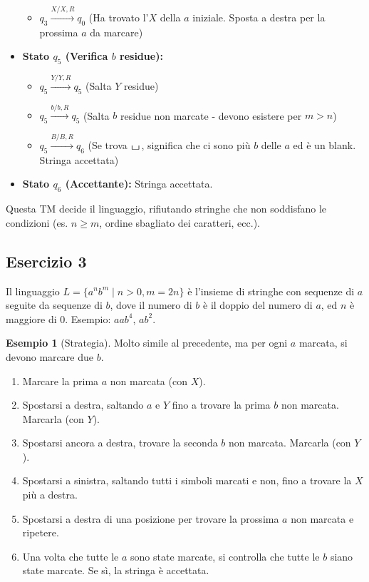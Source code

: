 \documentclass[a4paper]{article}
\theoremstyle{definition} %
\newtheorem{example}{Esempio}
\newcommand{\blankS}{\ensuremath{\raisebox{-0.15ex}{\scalebox{1.3}[0.7]{$\sqcup$}}\mkern2mu}}
\begin{document}
\begin{itemize}
\begin{itemize}
            \item $q_3 \xrightarrow{X / X, R} q_0$ (Ha trovato l'$X$ della $a$ iniziale. Sposta a destra per la prossima $a$ da marcare)
        \end{itemize}
    \item \textbf{Stato $q_5$ (Verifica $b$ residue):}
        \begin{itemize}
            \item $q_5 \xrightarrow{Y / Y, R} q_5$ (Salta $Y$ residue)
            \item $q_5 \xrightarrow{b / b, R} q_5$ (Salta $b$ residue non marcate - devono esistere per $m>n$)
            \item $q_5 \xrightarrow{B / B, R} q_6$ (Se trova \blankS, significa che ci sono più $b$ delle $a$ ed è un blank. Stringa accettata)
        \end{itemize}
    \item \textbf{Stato $q_6$ (Accettante):} Stringa accettata.
\end{itemize}
Questa TM decide il linguaggio, rifiutando stringhe che non soddisfano le condizioni (es. $n \ge m$, ordine sbagliato dei caratteri, ecc.).

\subsection{Esercizio 3}
Il linguaggio $L = \{a^n b^m \mid n > 0, m = 2n\}$ è l'insieme di stringhe con sequenze di $a$ seguite da sequenze di $b$, dove il numero di $b$ è il doppio del numero di $a$, ed $n$ è maggiore di $0$. Esempio: $aab^{4}$, $ab^{2}$.

\begin{example}[Strategia]
Molto simile al precedente, ma per ogni $a$ marcata, si devono marcare due $b$.
\begin{enumerate}
    \item Marcare la prima $a$ non marcata (con $X$).
    \item Spostarsi a destra, saltando $a$ e $Y$ fino a trovare la prima $b$ non marcata. Marcarla (con $Y$).
    \item Spostarsi ancora a destra, trovare la seconda $b$ non marcata. Marcarla (con $Y$).
    \item Spostarsi a sinistra, saltando tutti i simboli marcati e non, fino a trovare la $X$ più a destra.
    \item Spostarsi a destra di una posizione per trovare la prossima $a$ non marcata e ripetere.
    \item Una volta che tutte le $a$ sono state marcate, si controlla che tutte le $b$ siano state marcate. Se sì, la stringa è accettata.
\end{enumerate}
\end{example}
\end{document}
